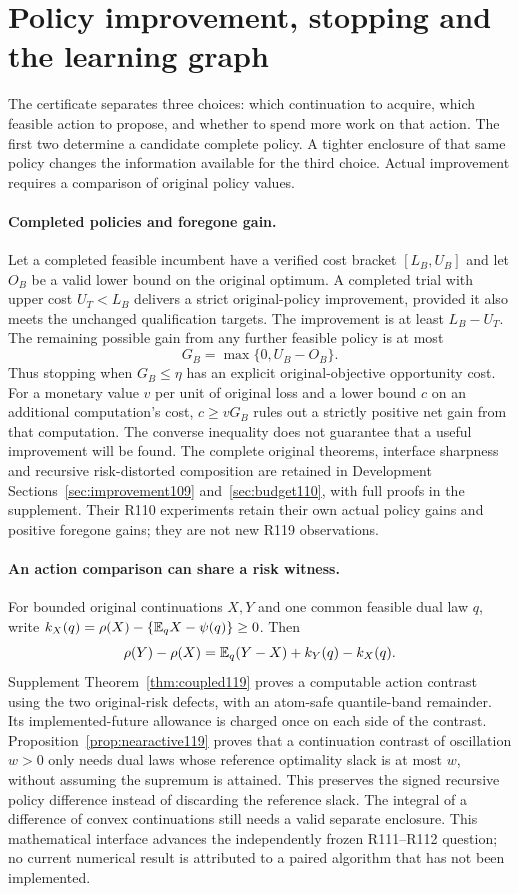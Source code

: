 \section{Policy improvement, stopping and the learning graph}\label{sec:policy119}
The certificate separates three choices: which continuation to acquire, which
feasible action to propose, and whether to spend more work on that action.
The first two determine a candidate complete policy. A tighter enclosure of
that same policy changes the information available for the third choice.
Actual improvement requires a comparison of original policy values.

\paragraph{Completed policies and foregone gain.}
Let a completed feasible incumbent have a verified cost bracket
$[L_B,U_B]$ and let $O_B$ be a valid lower bound on the original optimum.
A completed trial with upper cost $U_T<L_B$ delivers a strict original-policy
improvement, provided it also meets the unchanged qualification targets.
The improvement is at least $L_B-U_T$. The remaining possible gain from any
further feasible policy is at most
\[
 G_B=\max\{0,U_B-O_B\}.
\]
Thus stopping when $G_B\le\eta$ has an explicit original-objective opportunity
cost. For a monetary value $v$ per unit of original loss and a lower bound $c$
on an additional computation's cost, $c\ge vG_B$ rules out a strictly positive
net gain from that computation. The converse inequality does not guarantee
that a useful improvement will be found. The complete original theorems,
interface sharpness and recursive risk-distorted composition are retained in
Development Sections~\ref{sec:improvement109} and~\ref{sec:budget110}, with
full proofs in the supplement. Their R110 experiments retain their own actual
policy gains and positive foregone gains; they are not new R119 observations.

\paragraph{An action comparison can share a risk witness.}
For bounded original continuations $X,Y$ and one common feasible dual law $q$,
write $k_X(q)=\rho(X)-\{\mathbb E_qX-\psi(q)\}\ge0$. Then
\[
 \rho(Y)-\rho(X)=\mathbb E_q(Y-X)+k_Y(q)-k_X(q).
\]
Supplement Theorem~\ref{thm:coupled119} proves a computable action contrast
using the two original-risk defects, with an atom-safe quantile-band remainder.
Its implemented-future allowance is charged once on each side of the contrast.
Proposition~\ref{prop:nearactive119} proves that a continuation contrast of
oscillation $w>0$ only needs dual laws whose reference optimality slack is at
most $w$, without assuming the supremum is attained. This preserves the signed
recursive policy difference instead of discarding the reference slack.
The integral of a difference of convex continuations still needs a valid
separate enclosure. This mathematical interface advances the independently
frozen R111--R112 question; no current numerical result is attributed to a
paired algorithm that has not been implemented.

